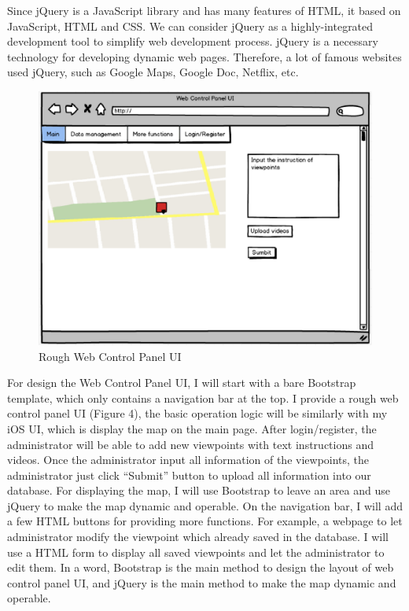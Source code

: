 \documentclass[letterpaper, 10pt,titlepage]{article}
\begin{document}
Since jQuery is a JavaScript library and has many features of HTML, it based on JavaScript, HTML and CSS. We can consider jQuery as a highly-integrated development tool to simplify web development process. jQuery is a necessary technology for developing dynamic web pages. Therefore, a lot of famous websites used jQuery, such as Google Maps, Google Doc, Netflix, etc.

\begin{figure}[ht]
    \centering
    \includegraphics[scale=0.5]{j4}
    \caption{Rough Web Control Panel UI}
    \label{jiawei4}
\end{figure}

For design the Web Control Panel UI, I will start with a bare Bootstrap template, which only contains a navigation bar at the top. I provide a rough web control panel UI (Figure 4), the basic operation logic will be similarly with my iOS UI, which is display the map on the main page. After login/register, the administrator will be able to add new viewpoints with text instructions and videos. Once the administrator input all information of the viewpoints, the administrator just click “Submit” button to upload all information into our database. For displaying the map, I will use Bootstrap to leave an area and use jQuery to make the map dynamic and operable. On the navigation bar, I will add a few HTML buttons for providing more functions. For example, a webpage to let administrator modify the viewpoint which already saved in the database. I will use a HTML form to display all saved viewpoints and let the administrator to edit them. In a word, Bootstrap is the main method to design the layout of web control panel UI, and jQuery is the main method to make the map dynamic and operable.
\end{document}
